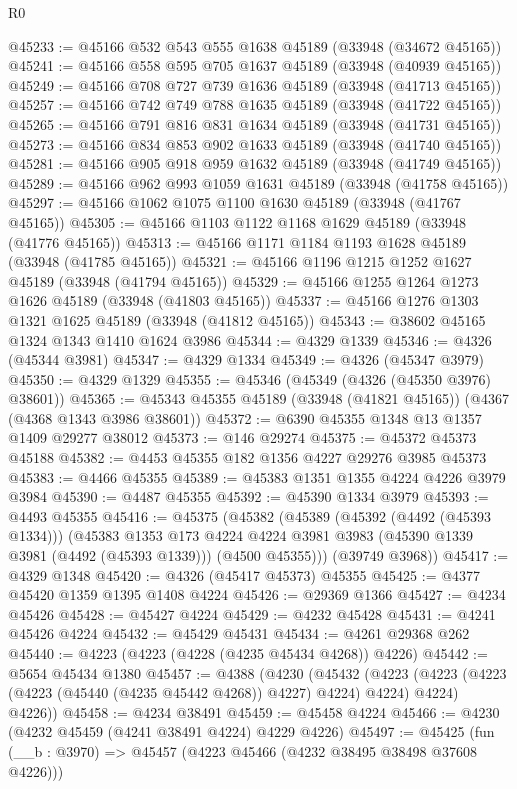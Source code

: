 \begin{lexlean}{R0}
\begin{coremodule}
@45233 := @45166 @532 @543 @555 @1638 @45189 (@33948 (@34672 @45165))
@45241 := @45166 @558 @595 @705 @1637 @45189 (@33948 (@40939 @45165))
@45249 := @45166 @708 @727 @739 @1636 @45189 (@33948 (@41713 @45165))
@45257 := @45166 @742 @749 @788 @1635 @45189 (@33948 (@41722 @45165))
@45265 := @45166 @791 @816 @831 @1634 @45189 (@33948 (@41731 @45165))
@45273 := @45166 @834 @853 @902 @1633 @45189 (@33948 (@41740 @45165))
@45281 := @45166 @905 @918 @959 @1632 @45189 (@33948 (@41749 @45165))
@45289 := @45166 @962 @993 @1059 @1631 @45189 (@33948 (@41758 @45165))
@45297 := @45166 @1062 @1075 @1100 @1630 @45189 (@33948 (@41767 @45165))
@45305 := @45166 @1103 @1122 @1168 @1629 @45189 (@33948 (@41776 @45165))
@45313 := @45166 @1171 @1184 @1193 @1628 @45189 (@33948 (@41785 @45165))
@45321 := @45166 @1196 @1215 @1252 @1627 @45189 (@33948 (@41794 @45165))
@45329 := @45166 @1255 @1264 @1273 @1626 @45189 (@33948 (@41803 @45165))
@45337 := @45166 @1276 @1303 @1321 @1625 @45189 (@33948 (@41812 @45165))
@45343 := @38602 @45165 @1324 @1343 @1410 @1624 @3986
@45344 := @4329 @1339
@45346 := @4326 (@45344 @3981)
@45347 := @4329 @1334
@45349 := @4326 (@45347 @3979)
@45350 := @4329 @1329
@45355 := @45346 (@45349 (@4326 (@45350 @3976) @38601))
@45365 := @45343 @45355 @45189 (@33948 (@41821 @45165)) (@4367 (@4368 @1343 @3986 @38601))
@45372 := @6390 @45355 @1348 @13 @1357 @1409 @29277 @38012
@45373 := @146 @29274
@45375 := @45372 @45373 @45188
@45382 := @4453 @45355 @182 @1356 @4227 @29276 @3985 @45373
@45383 := @4466 @45355
@45389 := @45383 @1351 @1355 @4224 @4226 @3979 @3984
@45390 := @4487 @45355
@45392 := @45390 @1334 @3979
@45393 := @4493 @45355
@45416 := @45375
    (@45382
      (@45389
        (@45392 (@4492 (@45393 @1334)))
        (@45383
          @1353
          @173
          @4224
          @4224
          @3981
          @3983
          (@45390 @1339 @3981 (@4492 (@45393 @1339)))
          (@4500 @45355)))
      (@39749 @3968))
@45417 := @4329 @1348
@45420 := @4326 (@45417 @45373) @45355
@45425 := @4377 @45420 @1359 @1395 @1408 @4224
@45426 := @29369 @1366
@45427 := @4234 @45426
@45428 := @45427 @4224
@45429 := @4232 @45428
@45431 := @4241 @45426 @4224
@45432 := @45429 @45431
@45434 := @4261 @29368 @262
@45440 := @4223 (@4223 (@4228 (@4235 @45434 @4268)) @4226)
@45442 := @5654 @45434 @1380
@45457 := @4388
    (@4230
      (@45432
        (@4223 (@4223 (@4223 (@4223 (@45440 (@4235 @45442 @4268)) @4227) @4224) @4224) @4224)
        @4226))
@45458 := @4234 @38491
@45459 := @45458 @4224
@45466 := @4230 (@4232 @45459 (@4241 @38491 @4224) @4229 @4226)
@45497 := @45425
    (fun (__b : @3970) => @45457 (@4223 @45466 (@4232 @38495 @38498 @37608 @4226)))

\end{coremodule}
\end{lexlean}

